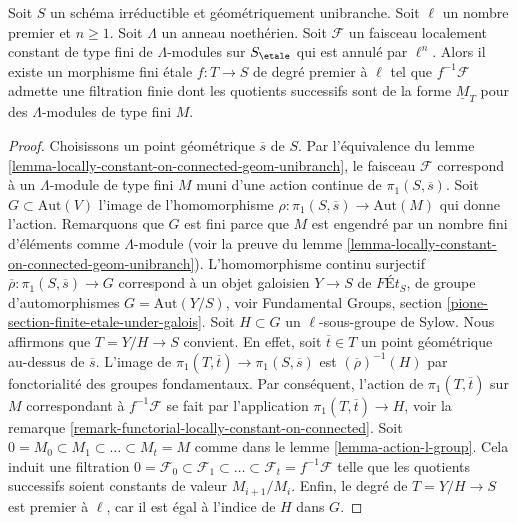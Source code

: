 \begin{lemma}
\label{lemma-pullback-filtered-modules}
Soit $S$ un sch\'ema irr\'eductible et g\'eom\'etriquement unibranche.
Soit $\ell$ un nombre premier et $n \geq 1$. Soit $\Lambda$
un anneau noeth\'erien. Soit $\mathcal{F}$ un faisceau localement
constant de type fini de $\Lambda$-modules sur $S_\etale$
qui est annul\'e par $\ell^n$. Alors il existe un
morphisme fini \'etale $f : T \to S$ de degr\'e premier \`a $\ell$
tel que $f^{-1}\mathcal{F}$ admette une filtration finie dont les
quotients successifs sont de la forme $\underline{M}_T$
pour des $\Lambda$-modules de type fini $M$.
\end{lemma}

\begin{proof}
Choisissons un point g\'eom\'etrique $\overline{s}$ de $S$.
Par l'\'equivalence du
lemme \ref{lemma-locally-constant-on-connected-geom-unibranch},
le faisceau $\mathcal{F}$ correspond \`a un $\Lambda$-module de type fini
$M$ muni d'une action continue de $\pi_1(S, \overline{s})$.
Soit $G \subset \text{Aut}(V)$ l'image de l'homomorphisme
$\rho : \pi_1(S, \overline{s}) \to \text{Aut}(M)$ qui donne l'action.
Remarquons que $G$ est fini parce que $M$ est engendr\'e
par un nombre fini d'\'el\'ements comme $\Lambda$-module (voir la preuve du lemme \ref{lemma-locally-constant-on-connected-geom-unibranch}).
L'homomorphisme continu surjectif
$\overline{\rho} : \pi_1(S, \overline{s}) \to G$
correspond \`a un objet galoisien $Y \to S$ de
$\textit{F\'Et}_S$, de groupe d'automorphismes $G = \text{Aut}(Y/S)$, voir
Fundamental Groups, section \ref{pione-section-finite-etale-under-galois}.
Soit $H \subset G$ un $\ell$-sous-groupe de Sylow.
Nous affirmons que $T = Y/H \to S$ convient. En effet, soit $\overline{t} \in T$
un point g\'eom\'etrique au-dessus de $\overline{s}$. L'image de
$\pi_1(T, \overline{t}) \to \pi_1(S, \overline{s})$
est $(\overline{\rho})^{-1}(H)$ par fonctorialit\'e
des groupes fondamentaux. Par cons\'equent, l'action de $\pi_1(T, \overline{t})$
sur $M$ correspondant \`a $f^{-1}\mathcal{F}$ se fait par
l'application $\pi_1(T, \overline{t}) \to H$, voir la
remarque \ref{remark-functorial-locally-constant-on-connected}.
Soit $0 = M_0 \subset M_1 \subset \ldots \subset M_t = M$
comme dans le lemme \ref{lemma-action-l-group}.
Cela induit une filtration
$0 = \mathcal{F}_0 \subset \mathcal{F}_1 \subset \ldots
\subset \mathcal{F}_t = f^{-1}\mathcal{F}$
telle que les quotients successifs soient constants de
valeur $M_{i + 1}/M_i$.
Enfin, le degr\'e de $T = Y/H \to S$ est premier \`a $\ell$,
car il est \'egal \`a l'indice de $H$ dans $G$.
\end{proof}






